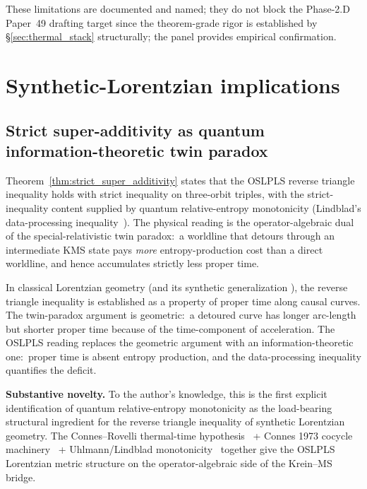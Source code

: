 \documentclass[11pt,a4paper]{article}
\theoremstyle{plain}
\theoremstyle{definition}
\begin{document}
These limitations are documented and named; they do not block the
Phase-2.D Paper~49 drafting target since the theorem-grade rigor is
established by \S\ref{sec:thermal_stack} structurally; the panel
provides empirical confirmation.

\section{Synthetic-Lorentzian implications}\label{sec:synthetic_implications}

\subsection{Strict super-additivity as quantum information-theoretic
twin paradox}\label{sec:twin_paradox_again}

Theorem~\ref{thm:strict_super_additivity} states that the OSLPLS
reverse triangle inequality holds with strict inequality on
three-orbit triples, with the strict-inequality content supplied by
quantum relative-entropy monotonicity (Lindblad's data-processing
inequality~\cite{lindblad1975}). The physical reading is the
operator-algebraic dual of the special-relativistic twin paradox:\ a
worldline that detours through an intermediate KMS state pays
\emph{more} entropy-production cost than a direct worldline, and
hence accumulates strictly less proper time.

In classical Lorentzian geometry (and its synthetic generalization
\cite{kunzinger_samann2018,mondino_samann2025_pointed}), the reverse
triangle inequality is established as a property of proper time along
causal curves. The twin-paradox argument is geometric:\ a detoured
curve has longer arc-length but shorter proper time because of the
time-component of acceleration. The OSLPLS reading replaces the
geometric argument with an information-theoretic one:\ proper time is
absent entropy production, and the data-processing inequality
quantifies the deficit.

\textbf{Substantive novelty.} To the author's knowledge, this is the
first explicit identification of quantum relative-entropy
monotonicity as the load-bearing structural ingredient for the
reverse triangle inequality of synthetic Lorentzian geometry. The
Connes--Rovelli thermal-time hypothesis~\cite{connes_rovelli1994} +
Connes 1973 cocycle machinery~\cite{connes1973} + Uhlmann/Lindblad
monotonicity~\cite{uhlmann1977,lindblad1975,wilde2017} together give
the OSLPLS Lorentzian metric structure on the operator-algebraic
side of the Krein--MS bridge.
\end{document}
